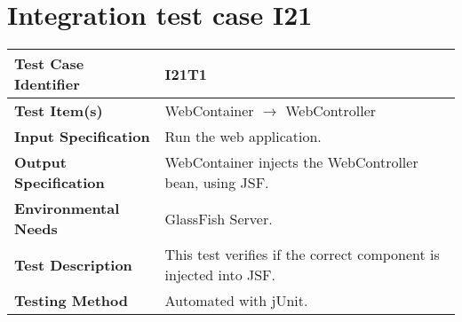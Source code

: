 \vspace{2em}

\section{Integration test case I21}

\begin{tabular}{l p{}}
    \hline
    \textbf{Test Case Identifier} & I21T1\\
    \hline
    \textbf{Test Item(s)} & WebContainer $\rightarrow$ WebController \\
    \hline
    \textbf{Input Specification} & Run the web application.\\
    \hline
    \textbf{Output Specification} & WebContainer injects the WebController bean, using JSF.\\
    \hline
    \textbf{Environmental Needs} & GlassFish Server.\\
    \hline
    \textbf{Test Description} & This test verifies if the correct component is injected into JSF.\\
    \hline
    \textbf{Testing Method} & Automated with jUnit. \\
    \hline
\end{tabular}
